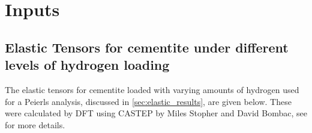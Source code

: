 \chapter{Inputs}

\section{Elastic Tensors for cementite under different levels of hydrogen loading}
\label{sec:elastic_tensors}

The elastic tensors for cementite loaded with varying amounts of hydrogen used for a Peierls analysis, discussed in \autoref{sec:elastic_results}, are given below. These were calculated by DFT using CASTEP \cite{Clark2005} by Miles Stopher and David Bombac, see \cite{Stopher2017} for more details. 

